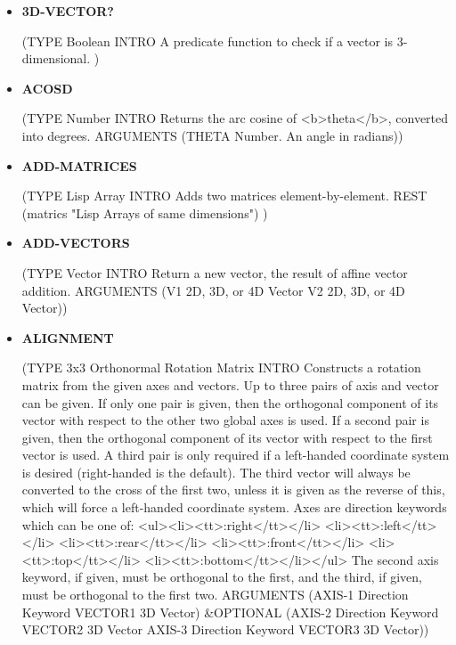 \documentclass [11pt]{book}
\begin{document}
\begin{itemize}
\item {}
\label{prim:3d-vector?}
\textbf{3D-VECTOR?}

(TYPE Boolean INTRO  A predicate function to check if a vector is 3-dimensional.
)



\item {}
\label{prim:acosd}
\textbf{ACOSD}

(TYPE Number INTRO  Returns the arc cosine of <b>theta</b>, converted into degrees.
 ARGUMENTS (THETA Number. An angle in radians))



\item {}
\label{prim:add-matrices}
\textbf{ADD-MATRICES}

(TYPE Lisp Array INTRO  Adds two matrices element-by-element.
 REST (matrics "Lisp Arrays of same dimensions") 
)



\item {}
\label{prim:add-vectors}
\textbf{ADD-VECTORS}

(TYPE Vector INTRO  Return a new vector, the result of affine vector addition.
 ARGUMENTS (V1 2D, 3D, or 4D Vector V2 2D, 3D, or 4D Vector))



\item {}
\label{prim:alignment}
\textbf{ALIGNMENT}

(TYPE 3x3 Orthonormal Rotation Matrix INTRO  Constructs a rotation
matrix from the given axes and vectors. Up to three
pairs of axis and vector can be given.
If only one pair is given, then the orthogonal component of its vector with respect to
the other two global axes is used.
If a second pair is given, then the orthogonal component of its vector
with respect to the first vector is used.
A third pair is only required if a left-handed coordinate system
is desired (right-handed is the default). The third vector will
always be converted to the cross of the first two, unless it is
given as the reverse of this, which will force a left-handed
coordinate system.
Axes are direction keywords which can be one of:
<ul><li><tt>:right</tt></li>
<li><tt>:left</tt></li>
<li><tt>:rear</tt></li>
<li><tt>:front</tt></li>
<li><tt>:top</tt></li>
<li><tt>:bottom</tt></li></ul>
The second axis keyword, if given, must be orthogonal to the first, and the third,
if given, must be orthogonal to the first two.
 ARGUMENTS (AXIS-1 Direction Keyword VECTOR1 3D Vector) \&OPTIONAL (AXIS-2 Direction Keyword VECTOR2 3D Vector AXIS-3 Direction Keyword VECTOR3 3D Vector))




\end{itemize}
\end{document}
